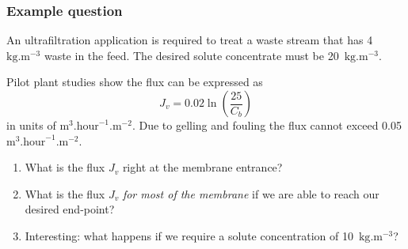 \begin{frame}\frametitle{Example question}
	An ultrafiltration application is required to treat a waste stream that has 4~$\text{kg}\text{.m}^{-3}$ waste in the feed. The desired solute concentrate must be 20~$\text{kg}\text{.m}^{-3}$.

	\vspace{12pt}
	Pilot plant studies show the flux can be expressed as
	\[
		J_v = 0.02 \ln \left(\frac{25}{C_b} \right)
	\]
	in units of $\text{m}^3.\text{hour}^{-1}.\text{m}^{-2}$. Due to gelling and fouling the flux cannot exceed 0.05 $\text{m}^3.\text{hour}^{-1}.\text{m}^{-2}$.

	\vspace{12pt}
	\begin{enumerate}
		\item	What is the flux $J_v$ right at the membrane entrance?
		\item	What is the flux $J_v$ \emph{{\color{myOrange}for most of the membrane}} if we are able to reach our desired end-point?
		\item	Interesting: what happens if we require a solute concentration of 10~$\text{kg}\text{.m}^{-3}$?
	\end{enumerate}
\end{frame}

